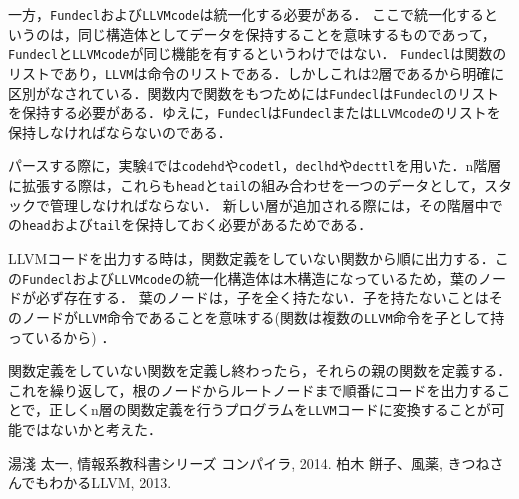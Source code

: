 \documentclass[uplatex]{jsarticle}
\begin{document}
一方，\verb#Fundecl#および\verb#LLVMcode#は統一化する必要がある．
ここで統一化するというのは，同じ構造体としてデータを保持することを意味するものであって，\verb#Fundecl#と\verb#LLVMcode#が同じ機能を有するというわけではない．
\verb#Fundecl#は関数のリストであり，\verb#LLVM#は命令のリストである．しかしこれは2層であるから明確に区別がなされている．関数内で関数をもつためには\verb#Fundecl#は\verb#Fundecl#のリストを保持する必要がある．ゆえに，\verb#Fundecl#は\verb#Fundecl#または\verb#LLVMcode#のリストを保持しなければならないのである．

パースする際に，実験4では\verb#codehd#や\verb#codetl#，\verb#declhd#や\verb#decttl#を用いた．n階層に拡張する際は，これらも\verb#head#と\verb#tail#の組み合わせを一つのデータとして，スタックで管理しなければならない．
新しい層が追加される際には，その階層中での\verb#head#および\verb#tail#を保持しておく必要があるためである．

LLVMコードを出力する時は，関数定義をしていない関数から順に出力する．この\verb#Fundecl#および\verb#LLVMcode#の統一化構造体は木構造になっているため，葉のノードが必ず存在する．
葉のノードは，子を全く持たない．子を持たないことはそのノードが\verb#LLVM#命令であることを意味する(関数は複数の\verb#LLVM#命令を子として持っているから)
．

関数定義をしていない関数を定義し終わったら，それらの親の関数を定義する．これを繰り返して，根のノードからルートノードまで順番にコードを出力することで，正しくn層の関数定義を行うプログラムを\verb#LLVM#コードに変換することが可能ではないかと考えた．

\begin{thebibliography}{9}
   湯淺 太一, 情報系教科書シリーズ コンパイラ, 2014.
   柏木 餅子、風薬, きつねさんでもわかるLLVM, 2013.
\end{thebibliography}
\end{document}
